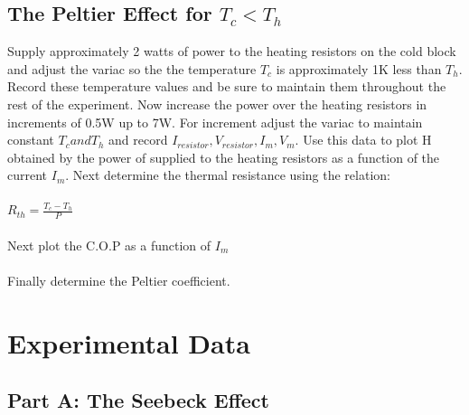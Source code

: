 \documentclass{article}
\begin{document}
\subsection{The Peltier Effect for $T_c<T_h$}
Supply approximately 2 watts of power to the heating resistors on the cold block and adjust the variac so the the temperature $T_c$ is approximately 1K less than $T_h$. Record these temperature values and be sure to maintain them throughout the rest of the experiment. Now increase the power over the heating resistors in increments of 0.5W up to 7W. For increment adjust the variac to maintain constant $T_c and T_h$ and record $I_{resistor}, V_{resistor}, I_m, V_m$. Use this data to plot H obtained by the power of supplied to the heating resistors as a function of the current $I_m$. Next determine the thermal resistance using the relation:\\\\
$R_{th}=\frac{T_c-T_h}{P}$\\\\
Next plot the C.O.P as a function of $I_m$\\\\
Finally determine the Peltier coefficient.

\section{Experimental Data}
\subsection{Part A: The Seebeck Effect}
\end{document}
